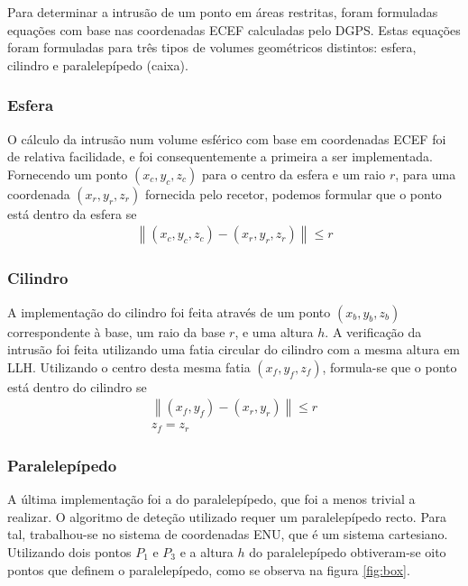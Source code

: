 \documentclass{article}
\begin{document}
Para determinar a intrusão de um ponto em áreas restritas, foram
formuladas equações com base nas coordenadas ECEF calculadas pelo
DGPS. Estas equações foram formuladas para três tipos de volumes
geométricos distintos: esfera, cilindro e paralelepípedo (caixa).

\subsubsection{Esfera}

O cálculo da intrusão num volume esférico com base em coordenadas
ECEF foi de relativa facilidade, e foi consequentemente a primeira a
ser implementada. Fornecendo um ponto $(x_c,y_c,z_c)$ para o centro
da esfera e um raio $r$, para uma coordenada $(x_r,y_r,z_r)$
fornecida pelo recetor, podemos formular que o ponto está dentro da 
esfera se
\begin{gather*}
	\left\lVert(x_c,y_c,z_c) - (x_r,y_r,z_r)\right\rVert \leq r
\end{gather*}

\subsubsection{Cilindro}

A implementação do cilindro foi feita através de um ponto $(x_b,y_b,
z_b)$ correspondente à base, um raio da base $r$, e uma altura $h$.
A verificação da intrusão foi feita utilizando uma fatia circular do
cilindro com a mesma altura em LLH. Utilizando o centro desta mesma fatia
$(x_f,y_f,z_f)$, formula-se que o ponto está dentro do cilindro se
\begin{gather*}
	\left\lVert(x_f,y_f) - (x_r,y_r)\right\rVert \leq r\\
    z_f = z_r
\end{gather*}

\subsubsection{Paralelepípedo}

A última implementação foi a do paralelepípedo, que foi a menos trivial a
realizar. O algoritmo de deteção utilizado requer um paralelepípedo
recto. Para tal, trabalhou-se no sistema de coordenadas ENU, que é um sistema cartesiano.
Utilizando dois pontos $P_1$ e $P_3$ e a altura $h$ do
paralelepípedo obtiveram-se oito pontos que definem o paralelepípedo,
como se observa na figura \ref{fig:box}.

\end{document}
